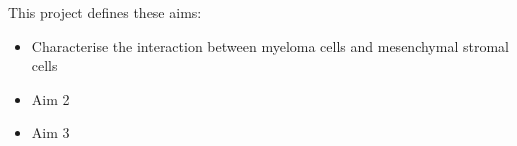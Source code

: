 \documentclass[12pt]{doctoral_thesis_uniwue}
\begin{document}




\newpage


This project defines these aims:


\begin{itemize}
    \item Characterise the interaction between myeloma cells and mesenchymal stromal cells
    \item Aim 2
    \item Aim 3

\end{itemize}

\newpage




\newpage

\newpage




\newpage





\newpage











\end{document}
